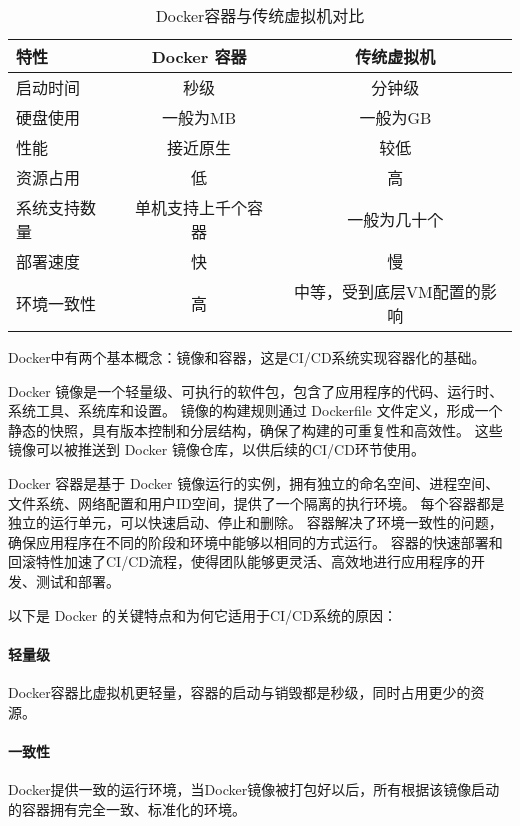 \begin{table}[h]
  \centering
  \caption{Docker容器与传统虚拟机对比}
  \label{tab:Docker容器与传统虚拟机对比}
  \begin{tabular}{lcc}
    \toprule
      特性           & Docker 容器            & 传统虚拟机               \\
    \midrule
      启动时间       & 秒级                   & 分钟级                   \\
      硬盘使用       & 一般为MB               & 一般为GB                  \\
      性能           & 接近原生               & 较低   \\
      资源占用       & 低                     & 高                       \\
      系统支持数量   & 单机支持上千个容器       & 一般为几十个              \\
      部署速度       & 快                     & 慢                        \\
      环境一致性     & 高                     & 中等，受到底层VM配置的影响  \\
    \bottomrule
  \end{tabular}
  \end{table}

Docker中有两个基本概念：镜像和容器，这是CI/CD系统实现容器化的基础\cite{boettiger2015introduction}。

Docker 镜像是一个轻量级、可执行的软件包，包含了应用程序的代码、运行时、系统工具、系统库和设置。
镜像的构建规则通过 Dockerfile 文件定义，形成一个静态的快照，具有版本控制和分层结构，确保了构建的可重复性和高效性。
这些镜像可以被推送到 Docker 镜像仓库，以供后续的CI/CD环节使用。

Docker 容器是基于 Docker 镜像运行的实例，拥有独立的命名空间、进程空间、文件系统、网络配置和用户ID空间，提供了一个隔离的执行环境。
每个容器都是独立的运行单元，可以快速启动、停止和删除。
容器解决了环境一致性的问题，确保应用程序在不同的阶段和环境中能够以相同的方式运行。
容器的快速部署和回滚特性加速了CI/CD流程，使得团队能够更灵活、高效地进行应用程序的开发、测试和部署。

以下是 Docker 的关键特点和为何它适用于CI/CD系统的原因：

\paragraph{轻量级}Docker容器比虚拟机更轻量，容器的启动与销毁都是秒级，同时占用更少的资源。

\paragraph{一致性}Docker提供一致的运行环境，当Docker镜像被打包好以后，所有根据该镜像启动的容器拥有完全一致、标准化的环境。

